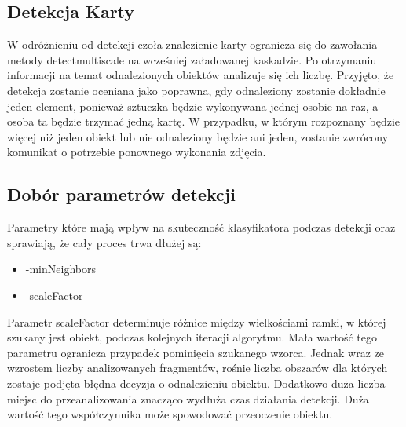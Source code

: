 \subsection{Detekcja Karty}

W odróżnieniu od detekcji czoła znalezienie karty ogranicza się do zawołania metody detectmultiscale na wcześniej załadowanej kaskadzie. Po otrzymaniu informacji na temat odnalezionych obiektów analizuje się ich liczbę. Przyjęto, że detekcja zostanie oceniana jako poprawna, gdy odnaleziony zostanie dokładnie jeden element, ponieważ sztuczka będzie wykonywana jednej osobie na raz, a osoba ta będzie trzymać jedną kartę. W przypadku, w którym rozpoznany będzie więcej niż jeden obiekt lub nie odnaleziony będzie ani jeden, zostanie zwrócony komunikat o potrzebie ponownego wykonania zdjęcia.

\subsection{Dobór parametrów detekcji}

Parametry które mają wpływ na skuteczność klasyfikatora podczas detekcji oraz sprawiają, że cały proces trwa dłużej są:
\begin{itemize}
    \item -minNeighbors
    \item -scaleFactor
\end{itemize}

Parametr scaleFactor determinuje różnice między wielkościami ramki, w której szukany jest obiekt, podczas kolejnych iteracji algorytmu. Mała wartość tego parametru ogranicza przypadek pominięcia szukanego wzorca. Jednak wraz ze wzrostem liczby analizowanych fragmentów, rośnie liczba obszarów dla których zostaje podjęta błędna decyzja o odnalezieniu obiektu. Dodatkowo duża liczba miejsc do przeanalizowania znacząco wydłuża czas działania detekcji. Duża wartość tego współczynnika może spowodować przeoczenie obiektu.


